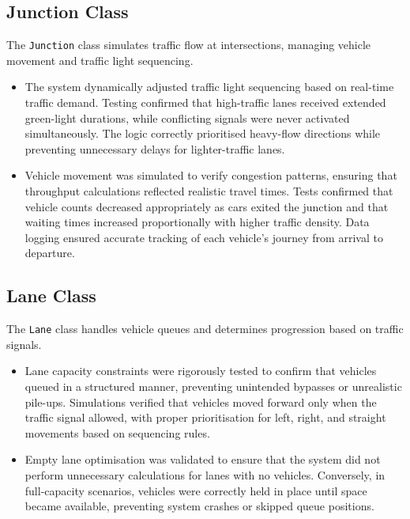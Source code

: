 \documentclass{article}
\begin{document}
    \subsection*{Junction Class}
    The \texttt{Junction} class simulates traffic flow at intersections, managing vehicle movement and traffic light sequencing.
    \begin{itemize}
        \item The system dynamically adjusted traffic light sequencing based on real-time traffic demand. Testing confirmed that high-traffic lanes received extended green-light durations, while conflicting signals were never activated simultaneously. The logic correctly prioritised heavy-flow directions while preventing unnecessary delays for lighter-traffic lanes.
        \item Vehicle movement was simulated to verify congestion patterns, ensuring that throughput calculations reflected realistic travel times. Tests confirmed that vehicle counts decreased appropriately as cars exited the junction and that waiting times increased proportionally with higher traffic density. Data logging ensured accurate tracking of each vehicle’s journey from arrival to departure.
    \end{itemize}

    \subsection*{Lane Class}
    The \texttt{Lane} class handles vehicle queues and determines progression based on traffic signals.
    \begin{itemize}
        \item Lane capacity constraints were rigorously tested to confirm that vehicles queued in a structured manner, preventing unintended bypasses or unrealistic pile-ups. Simulations verified that vehicles moved forward only when the traffic signal allowed, with proper prioritisation for left, right, and straight movements based on sequencing rules.
        \item Empty lane optimisation was validated to ensure that the system did not perform unnecessary calculations for lanes with no vehicles. Conversely, in full-capacity scenarios, vehicles were correctly held in place until space became available, preventing system crashes or skipped queue positions.
    \end{itemize}
\end{document}
